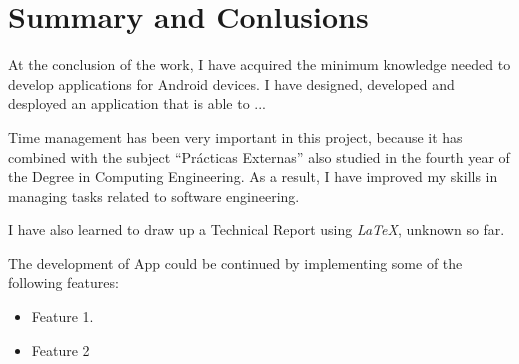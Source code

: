 %
%
%
%
\chapter{Summary and Conlusions}
At the conclusion of the work, I have acquired the minimum knowledge needed
to develop applications for Android devices.
I have designed, developed and desployed an application that is able to ...

Time management has been very important in this project, because it has combined with the subject ``Prácticas Externas'' also studied in the fourth year 
of the Degree in Computing Engineering. 
As a result, I have improved my skills in managing tasks related to software engineering.

I have also learned to draw up a Technical Report using \textit{LaTeX}, unknown so far.

The development of App could be continued by implementing some of the following features:
\begin{itemize}
\item Feature 1.
\item Feature 2
\end{itemize}